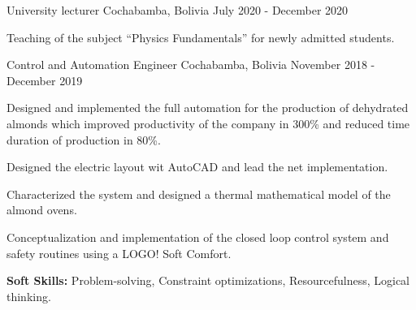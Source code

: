 \begin{cventries}
    {University lecturer}
    {Cochabamba, Bolivia}
    {July 2020 - December 2020}
    {
      \begin{cvitems}
        \item Teaching of the subject ``Physics Fundamentals'' for
        newly admitted students.
      \end{cvitems}
    }

    {Control and Automation Engineer}
    {Cochabamba, Bolivia}
    {November 2018 - December 2019}
    {
      \begin{cvitems}
        \item Designed and implemented the full automation for the
        production of dehydrated almonds which improved productivity
        of the company in 300\% and reduced time duration of
        production in 80\%.
        \item Designed the electric layout wit AutoCAD and lead the
        net implementation.
        \item Characterized the system and designed a thermal
        mathematical model of the almond ovens.
        \item Conceptualization and implementation of the closed loop
        control system and safety routines using a LOGO! Soft Comfort.
        \item \textbf{Soft Skills:} Problem-solving, Constraint
        optimizations, Resourcefulness, Logical thinking.
      \end{cvitems}
    }
\end{cventries}
